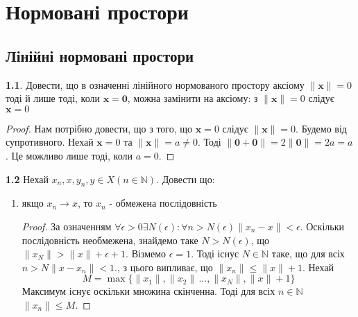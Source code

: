 \documentclass[a4paper,12pt,twoside]{book}
\begin{document}
\chapter{Нормовані простори}
\section{Лінійні нормовані простори}
\textbf{1.1}. Довести, що в означенні лінійного нормованого простору аксіому $\|\mathbf{x}\| = 0$ тоді й лише тоді, коли $\mathbf{x} = \mathbf{0}$, можна замінити на аксіому: з $\|\mathbf{x}\| = 0$ слідує $\mathbf{x} = 0$
\begin{proof}
    Нам потрібно довести, що з того, що $\mathbf{x} = 0$ слідує $\|\mathbf{x}\| = 0$. Будемо від супротивного. Нехай $\mathbf{x} = 0$ та $\|\mathbf{x}\| = a \neq 0$. Тоді $\|\mathbf{0} + \mathbf{0}\| = 2\|\mathbf{0}\|  = 2a = a $. Це можливо лише тоді, коли $a = 0$.
\end{proof}
\textbf{1.2} Нехай $x_n, x, y_n, y \in X (n \in \mathbb{N})$. Довести що:
\begin{enumerate}
    \item якщо $x_n \rightarrow x$, то $x_n$ - обмежена послідовність
    \begin{proof}
        За означенням $\forall \epsilon > 0 \exists N(\epsilon): \forall n > N(\epsilon) \|x_n - x\| < \epsilon$. Оскільки послідовність необмежена, знайдемо таке $N > N(\epsilon)$, що $\|x_N\| > \|x\| + \epsilon + 1$. Візмемо $\epsilon = 1$. Тоді існує $N \in \mathbb{N}$ таке, що для всіх $n > N \|x - x_n\| < 1.$, з цього випливає, що $\|x_n\| \leq \|x\| + 1$. Нехай
        \begin{equation}
            M = \max \{\|x_1\|,\|x_2\|\, ..., \|x_N\|, \|x\| + 1\}
        \end{equation}
    Максимум існує оскільки множина скінченна. Тоді для всіх $n \in \mathbb{N}$ $\|x_n\|\leq M$.
    \end{proof}
\end{enumerate}
\end{document}

